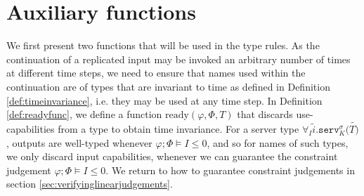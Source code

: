 \section{Auxiliary functions}
We first present two functions that will be used in the type rules. As the continuation of a replicated input may be invoked an arbitrary number of times at different time steps, we need to ensure that names used within the continuation are of types that are invariant to time as defined in Definition \ref{def:timeinvariance}, i.e. they may be used at any time step. In Definition \ref{def:readyfunc}, we define a function $\text{ready}(\varphi,\Phi,T)$ that discards use-capabilities from a type to obtain time invariance. For a server type $\forall_I\widetilde{i}.\texttt{serv}^\sigma_K(\widetilde{T)}$, outputs are well-typed whenever $\varphi;\Phi\vDash I \leq 0$, and so for names of such types, we only discard input capabilities, whenever we can guarantee the constraint judgement $\varphi;\Phi\vDash I \leq 0$. We return to how to guarantee constraint judgements in section \ref{sec:verifyinglinearjudgements}.
%

